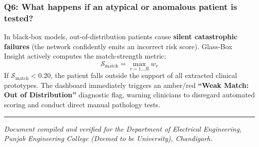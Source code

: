 \subsubsection{Q6: What happens if an atypical or anomalous patient is
tested?}\label{q6-what-happens-if-an-atypical-or-anomalous-patient-is-tested}

In black-box models, out-of-distribution patients cause \textbf{silent
catastrophic failures} (the network confidently emits an incorrect risk
score). Glass-Box Insight actively computes the match-strength metric:
\[\mathcal{S}_{\text{match}} = \max_{r=1 \dots R} w_r\] If
\(\mathcal{S}_{\text{match}} < 0.20\), the patient falls outside the
support of all extracted clinical prototypes. The dashboard immediately
triggers an amber/red \textbf{``Weak Match: Out of Distribution''}
diagnostic flag, warning clinicians to disregard automated scoring and
conduct direct manual pathology tests.

\begin{center}\rule{0.5\linewidth}{0.5pt}\end{center}

\emph{Document compiled and verified for the Department of Electrical
Engineering, Punjab Engineering College (Deemed to be University),
Chandigarh.}
